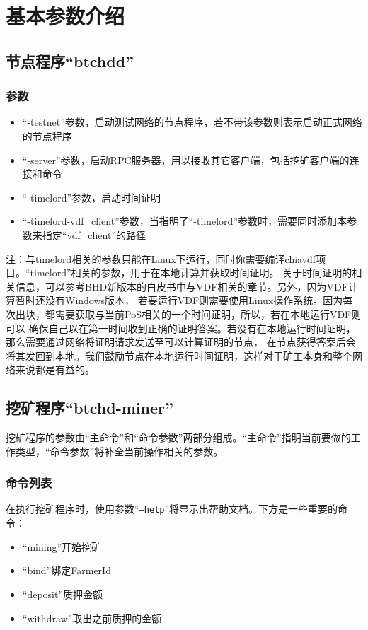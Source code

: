 \section{基本参数介绍}
\subsection{节点程序``btchdd''}
\subsubsection{参数}
\begin{itemize}
    \item ``-testnet''参数，启动测试网络的节点程序，若不带该参数则表示启动正式网络的节点程序
    \item ``-server''参数，启动RPC服务器，用以接收其它客户端，包括挖矿客户端的连接和命令
    \item ``-timelord''参数，启动时间证明
    \item ``-timelord-vdf\_client''参数，当指明了``-timelord''参数时，需要同时添加本参数来指定``vdf\_client''的路径
\end{itemize}
\begin{flushleft}
    注：与timelord相关的参数只能在Linux下运行，同时你需要编译chiavdf项目。``timelord''相关的参数，用于在本地计算并获取时间证明。
    关于时间证明的相关信息，可以参考BHD新版本的白皮书中与VDF相关的章节。另外，因为VDF计算暂时还没有Windows版本，
    若要运行VDF则需要使用Linux操作系统。因为每次出块，都需要获取与当前PoS相关的一个时间证明，所以，若在本地运行VDF则可以
    确保自己以在第一时间收到正确的证明答案。若没有在本地运行时间证明，那么需要通过网络将证明请求发送至可以计算证明的节点，
    在节点获得答案后会将其发回到本地。我们鼓励节点在本地运行时间证明，这样对于矿工本身和整个网络来说都是有益的。
\end{flushleft}\subsection{挖矿程序``btchd-miner''}
\begin{flushleft}
    挖矿程序的参数由``主命令''和``命令参数''两部分组成。``主命令''指明当前要做的工作类型，``命令参数''将补全当前操作相关的参数。
\end{flushleft}
\subsubsection{命令列表}
\begin{flushleft}
    在执行挖矿程序时，使用参数``\texttt{--help}''将显示出帮助文档。下方是一些重要的命令：
\end{flushleft}
\begin{itemize}
    \item ``mining''开始挖矿
    \item ``bind''绑定FarmerId
    \item ``deposit''质押金额
    \item ``withdraw''取出之前质押的金额
\end{itemize}

